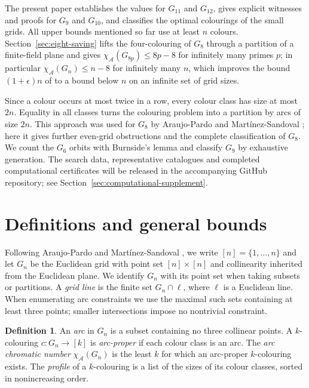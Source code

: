 \documentclass[11pt]{article}
\theoremstyle{definition}
\newtheorem{definition}[theorem]{Definition}
\theoremstyle{remark}
\renewcommand{\le}{\leqslant}
\begin{document}
The present paper establishes the values for \(G_{11}\) and \(G_{12}\),
gives explicit witnesses and proofs for \(G_9\) and \(G_{10}\), and
classifies the optimal colourings of the small grids.  All upper bounds
mentioned so far use at least \(n\) colours.  Section~\ref{sec:eight-saving}
lifts the four-colouring of \(G_8\) through a partition of a finite-field
plane and gives \(\chi_{\mathcal A}(G_{8p})\le 8p-8\) for infinitely many
primes \(p\); in particular \(\chi_{\mathcal A}(G_n)\le n-8\) for infinitely
many \(n\), which improves the bound \((1+\epsilon)n\) of
\cite{AraujoMartinez2026} to a bound below \(n\) on an infinite set of grid
sizes.

Since a colour occurs at most twice in a row, every colour class has size
at most \(2n\).  Equality in all classes turns the colouring problem into a
partition by arcs of size \(2n\).  This approach was used for \(G_8\)
by Araujo-Pardo and Mart\'inez-Sandoval
\cite[Sections~4.2 and~5]{AraujoMartinez2026}; here it gives further
even-grid obstructions and the complete classification of \(G_8\).  We count the \(G_6\) orbits with Burnside's lemma
and classify \(G_9\) by exhaustive generation.  The search data, representative catalogues and completed computational
certificates will be released in the accompanying GitHub repository; see
Section~\ref{sec:computational-supplement}.

\section{Definitions and general bounds}
\label{sec:general-bounds}

Following Araujo-Pardo and Mart\'inez-Sandoval \cite{AraujoMartinez2026},
we write \([n]=\{1,\ldots,n\}\) and let \(G_n\) be the Euclidean grid with
point set \([n]\times[n]\) and collinearity inherited from the Euclidean plane.
We identify \(G_n\) with its point set when taking subsets or partitions.
A \emph{grid line} is the finite set \(G_n\cap\ell\), where \(\ell\) is a
Euclidean line.  When enumerating arc constraints we use the maximal such
sets containing at least three points; smaller intersections impose no
nontrivial constraint.

\begin{definition}
An \emph{arc} in \(G_n\) is a subset containing no three collinear points.
A \(k\)-colouring \(c:G_n\to[k]\) is \emph{arc-proper} if each colour class
is an arc.  The \emph{arc chromatic number} \(\chi_{\mathcal{A}}(G_n)\) is the
least \(k\) for which an arc-proper \(k\)-colouring exists. The \emph{profile} of a $k$-colouring is a list of the sizes of its colour classes, sorted in nonincreasing order.
\end{definition}
\end{document}
